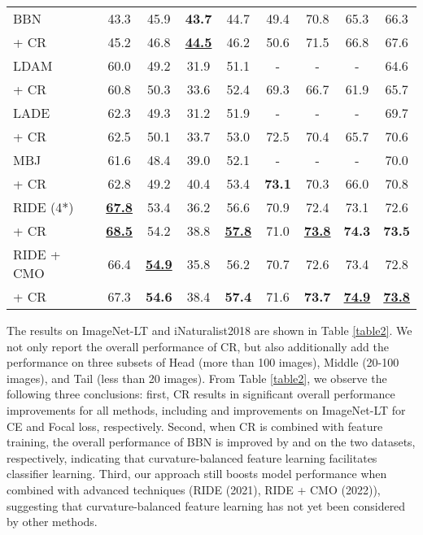 \documentclass[10pt,twocolumn,letterpaper]{article}
\begin{document}
\begin{table}[t]
\begin{small}
\begin{tabular}{l|cccc| cccc}
BBN \cite{paper5}   &43.3 & 45.9 & \textbf{43.7}  & 44.7 & 49.4  & 70.8 & 65.3 & 66.3 \\  
\rowcolor{blue!5} + CR & 45.2& 46.8 & \underline{\textbf{44.5}} & 46.2 &50.6 & 71.5 &66.8 & 67.6\\  \hline

LDAM \cite{paper2} &60.0 & 49.2 & 31.9 & 51.1 & \multicolumn{1}{c}{-}  & \multicolumn{1}{c}{-} & \multicolumn{1}{c}{-} & 64.6\\
\rowcolor{blue!5} + CR &60.8 & 50.3 &33.6 &52.4 & 69.3  &66.7  &61.9 &65.7 \\ \hline

LADE \cite{paper14} &62.3 & 49.3 & 31.2 & 51.9 & \multicolumn{1}{c}{-}  & \multicolumn{1}{c}{-} & \multicolumn{1}{c}{-} & 69.7\\
\rowcolor{blue!5} + CR &62.5 & 50.1 &33.7 &53.0 &72.5  &70.4  &65.7  &70.6 \\ \hline

MBJ \cite{paper15} &61.6 & 48.4 & 39.0 & 52.1 & \multicolumn{1}{c}{-}  & \multicolumn{1}{c}{-} & \multicolumn{1}{c}{-} & 70.0 \\
\rowcolor{blue!5} + CR &62.8 & 49.2 & 40.4 &53.4 &\textbf{73.1}  &70.3 &66.0 & 70.8 \\ \hline

RIDE (4*) \cite{paper7}  &\underline{\textbf{67.8}} &53.4 &36.2 &56.6 &70.9 &72.4 &73.1 &72.6 \\ 
\rowcolor{blue!5} + CR  &\underline{\textbf{68.5}} &54.2 &38.8 &\underline{\textbf{57.8}} &71.0 & \underline{\textbf{73.8}} &\textbf{74.3} &\textbf{73.5} \\ \hline

RIDE + CMO \cite{paper8}  &66.4 & \underline{\textbf{54.9}} & 35.8 & 56.2 &70.7  & 72.6 &73.4 & 72.8 \\ 
\rowcolor{blue!5} + CR      &67.3 & \textbf{54.6} &38.4 & \textbf{57.4} &71.6  &\textbf{73.7} &\underline{\textbf{74.9}} &\underline{\textbf{73.8}} \\
\bottomrule \hline
 \end{tabular}
 \end{small}
 \vskip -0.2in
 \end{table}


The results on ImageNet-LT and iNaturalist2018 are shown in Table \ref{table2}. We not only report the overall performance of CR, but also additionally add the performance on three subsets of Head (more than 100 images), Middle (20-100 images), and Tail (less than 20 images). From Table \ref{table2}, we observe the following three conclusions: first, CR results in significant overall performance improvements for all methods, including  and  improvements on ImageNet-LT for CE and Focal loss, respectively. Second, when CR is combined with feature training, the overall performance of BBN \cite{paper5} is improved by  and  on the two datasets, respectively, indicating that curvature-balanced feature learning facilitates classifier learning. Third, our approach still boosts model performance when combined with advanced techniques (RIDE \cite{paper7} (2021), RIDE + CMO \cite{paper8} (2022)), suggesting that curvature-balanced feature learning has not yet been considered by other methods.
\end{document}
